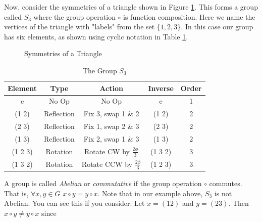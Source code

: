 \documentclass[11pt, oneside]{article}   	%
\theoremstyle{definition}
\begin{document}
\bigskip
\noindent
Now, consider the  symmetries of a triangle shown in Figure \ref{fig:symmetries_of_a_triangle}.  This forms a group called $S_3$ where
the group operation $\circ$ is function composition. Here we name the vertices of the triangle with "labels" from the set $\{1,2,3\}$. In this 
case our group has six elements, as shown using cyclic notation in Table \ref{tab:s3}.

\bigskip
\begin{figure}
\caption{Symmetries of a Triangle}
\label{fig:symmetries_of_a_triangle}
\end{figure}


\bigskip
\begin{table}[H]
\centering
\begin{tabular}{c | |c| c | c | c }
Element & Type & Action & Inverse & Order \\
\hline
e         &  No Op       & No Op                                         & e & 1               \\
(1 2)    & Reflection  & Fix 3, swap 1 \& 2                        & (1 2) & 2         \\
(2 3)    & Reflection  & Fix 1, swap 2 \& 3                        & (2 3) & 2         \\
(1 3)    & Reflection  &  Fix 2, swap 1 \& 3                       & (1 3) & 2         \\
(1 2 3) & Rotation     & Rotate CW by $\frac{2 \phi}{3}$    & (1 3 2) & 3      \\
(1 3 2) & Rotation     & Rotate CCW by $\frac{2 \phi}{3}$  & (1 2 3) & 3
\end{tabular}
\caption{The Group $S_3$}
\label{tab:s3}
\end{table}

\noindent
A group is called \emph{Abelian} or \emph{commutative} if the group operation $\circ$ commutes. That is, $\forall x,y \in G$  $x \circ y = y \circ x$. Note
that in our example above, $S_3$ is not Abelian. You can see this if you consider: Let $x = (1 2)$ and $y = (2 3)$. Then $x \circ y \neq y \circ x$ since
\end{document}
